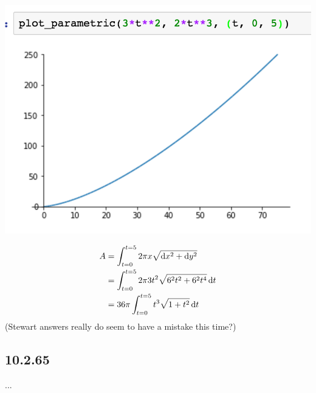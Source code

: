 \begin{mdframed}
  \includegraphics[width=400pt]{img/10-2-66.png}

  \begin{align*}
    A &= \int_{t=0}^{t=5} 2\pi x \sqrt{\dx^2 + \dy^2}\\
      &= \int_{t=0}^{t=5} 2\pi 3t^2 \sqrt{6^2t^2 + 6^2t^4} \dt\\
      &= 36\pi \int_{t=0}^{t=5} t^3 \sqrt{1 + t^2} \dt\\
  \end{align*}
  (Stewart answers really do seem to have a mistake this time?)
\end{mdframed}

\subsection*{10.2.65}
...

